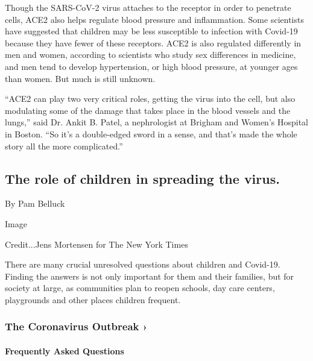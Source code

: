 Though the SARS-CoV-2 virus attaches to the receptor in order to
penetrate cells, ACE2 also helps regulate blood pressure and
inflammation. Some scientists have suggested that children may be less
susceptible to infection with Covid-19 because they have fewer of these
receptors. ACE2 is also regulated differently in men and women,
according to scientists who study sex differences in medicine, and men
tend to develop hypertension, or high blood pressure, at younger ages
than women. But much is still unknown.

``ACE2 can play two very critical roles, getting the virus into the
cell, but also modulating some of the damage that takes place in the
blood vessels and the lungs,'' said Dr. Ankit B. Patel, a nephrologist
at Brigham and Women's Hospital in Boston. ``So it's a double-edged
sword in a sense, and that's made the whole story all the more
complicated.''

\hypertarget{the-role-of-children-in-spreading-the-virus}{%
\subsection{The role of children in spreading the
virus.}\label{the-role-of-children-in-spreading-the-virus}}

By Pam Belluck

Image

Credit...Jens Mortensen for The New York Times

There are many crucial unresolved questions about children and Covid-19.
Finding the answers is not only important for them and their families,
but for society at large, as communities plan to reopen schools, day
care centers, playgrounds and other places children frequent.

\href{https://www.nytimes3xbfgragh.onion/news-event/coronavirus?action=click\&pgtype=Article\&state=default\&region=MAIN_CONTENT_3\&context=storylines_faq}{}

\hypertarget{the-coronavirus-outbreak-}{%
\subsubsection{The Coronavirus Outbreak
›}\label{the-coronavirus-outbreak-}}

\hypertarget{frequently-asked-questions}{%
\paragraph{Frequently Asked
Questions}\label{frequently-asked-questions}}

